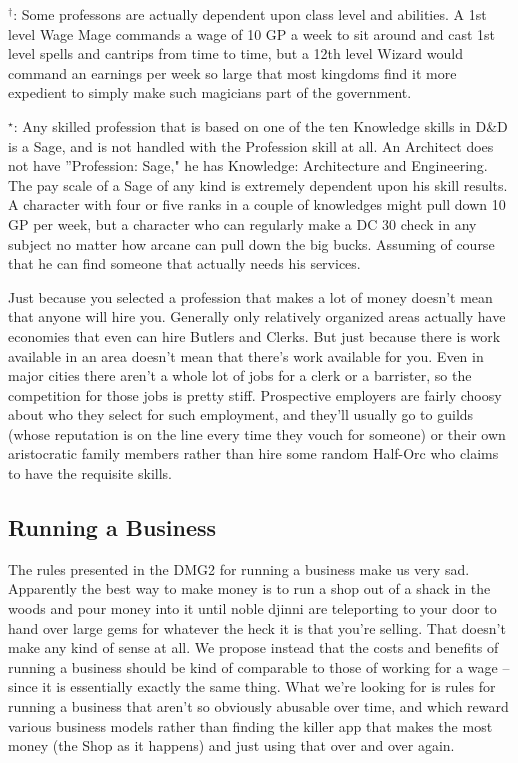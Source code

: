 \begin{multicols}{2}
\begin{small}
\noindent $^\dagger$: Some professons are actually dependent upon class level and abilities. A 1st level Wage Mage commands a wage of 10 GP a week to sit around and cast 1st level spells and cantrips from time to time, but a 12th level Wizard would command an earnings per week so large that most kingdoms find it more expedient to simply make such magicians part of the government.

\noindent $^\star$: Any skilled profession that is based on one of the ten Knowledge skills in D\&D is a Sage, and is not handled with the Profession skill at all. An Architect does not have ''Profession: Sage," he has Knowledge: Architecture and Engineering. The pay scale of a Sage of any kind is extremely dependent upon his skill results. A character with four or five ranks in a couple of knowledges might pull down 10 GP per week, but a character who can regularly make a DC 30 check in any subject no matter how arcane can pull down the big bucks. Assuming of course that he can find someone that actually needs his services.
\end{small}
\end{multicols}


Just because you selected a profession that makes a lot of money doesn't mean that anyone will hire you. Generally only relatively organized areas actually have economies that even can hire Butlers and Clerks. But just because there is work available in an area doesn't mean that there's work available for you. Even in major cities there aren't a whole lot of jobs for a clerk or a barrister, so the competition for those jobs is pretty stiff. Prospective employers are fairly choosy about who they select for such employment, and they'll usually go to guilds (whose reputation is on the line every time they vouch for someone) or their own aristocratic family members rather than hire some random Half-Orc who claims to have the requisite skills.

\subsection{Running a Business}

The rules presented in the DMG2 for running a business make us very sad. Apparently the best way to make money is to run a shop out of a shack in the woods and pour money into it until noble djinni are teleporting to your door to hand over large gems for whatever the heck it is that you're selling. That doesn't make any kind of sense at all. We propose instead that the costs and benefits of running a business should be kind of comparable to those of working for a wage -- since it is essentially exactly the same thing. What we're looking for is rules for running a business that aren't so obviously abusable over time, and which reward various business models rather than finding the killer app that makes the most money (the Shop as it happens) and just using that over and over again.

